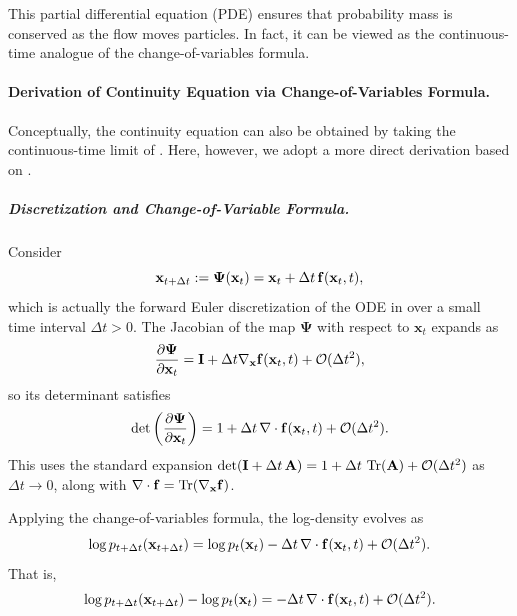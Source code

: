This partial differential equation (PDE) ensures that probability mass is conserved as the flow moves particles.  
In fact, it can be viewed as the continuous-time analogue of the change-of-variables formula.


\paragraph{Derivation of Continuity Equation via  Change-of-Variables Formula.} Conceptually, the continuity equation can also be obtained by taking the continuous-time limit of . Here, however, we adopt a more direct derivation based on .
\subparagraph{Discretization and Change-of-Variable Formula.}
Consider 
\[
\mathbf{x}_{t+\Delta t} := \bm{\Psi}(\mathbf{x}_t) = \mathbf{x}_t + \Delta t\, {\mathbf{f}}(\mathbf{x}_t, t),
\]
which is actually the forward Euler discretization of the ODE in  over a small time interval $\Delta t > 0$.
The Jacobian of the map $\bm{\Psi}$ with respect to $\mathbf{x}_t$ expands as
\[
\frac{\partial \bm{\Psi}}{\partial \mathbf{x}_t} = {\mathbf{I}} + \Delta t \nabla_{\mathbf{x}} {\mathbf{f}}(\mathbf{x}_t, t) + \mathcal{O}(\Delta t^2),
\]
so its determinant satisfies
\[
\det\left( \frac{\partial \bm{\Psi}}{\partial \mathbf{x}_t} \right) = 1 + \Delta t\, \nabla \cdot {\mathbf{f}}(\mathbf{x}_t, t) + \mathcal{O}(\Delta t^2).
\]
This uses the standard expansion $\det({\mathbf{I}} + \Delta t\, \mathbf{A}) = 1 + \Delta t\, \operatorname{Tr}(\mathbf{A}) + \mathcal{O}(\Delta t^2)$ as $\Delta t \to 0$, along with $\nabla \cdot {\mathbf{f}} = \operatorname{Tr}(\nabla_{\mathbf{x}} {\mathbf{f}})$.

Applying the change-of-variables formula, the log-density evolves as
\begin{align*}
\log p_{t+\Delta t}(\mathbf{x}_{t+\Delta t}) = \log p_t(\mathbf{x}_t) - \Delta t\, \nabla \cdot {\mathbf{f}}(\mathbf{x}_t, t) + \mathcal{O}(\Delta t^2).
\end{align*}
That is,
\begin{align}
    \label{eq:log-density-diff}
\log p_{t+\Delta t}(\mathbf{x}_{t+\Delta t}) - \log p_t(\mathbf{x}_t) = - \Delta t\, \nabla \cdot {\mathbf{f}}(\mathbf{x}_t, t) + \mathcal{O}(\Delta t^2).
\end{align}

